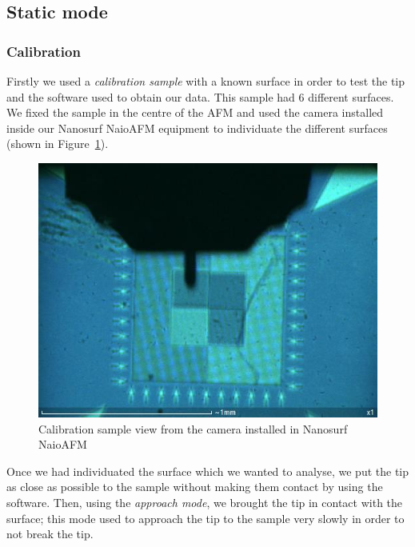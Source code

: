 \documentclass[11pt,a4paper]{article}
\begin{document}
\subsection{Static mode}

\subsubsection{Calibration}
Firstly we used a \emph{calibration sample} with a known surface in order to test the tip and the software used to obtain our data. This sample had 6 different surfaces. We fixed the sample in the centre of the AFM and used the camera installed inside our Nanosurf NaioAFM equipment to individuate the different surfaces (shown in Figure~\ref{fig:cal_sam}).
\begin{figure}[ht]
\begin{center}
\includegraphics[scale=0.4]{calibration_sample.JPG}
\caption{Calibration sample view from the camera installed in Nanosurf NaioAFM}\label{fig:cal_sam}
\end{center}
\end{figure}

Once we had individuated the surface which we wanted to analyse, we put the tip as close as possible to the sample without making them contact by using the software. Then, using the \emph{approach mode}, we brought the tip in contact with the surface; this mode used to approach the tip to the sample very slowly in order to not break the tip.
\end{document}

